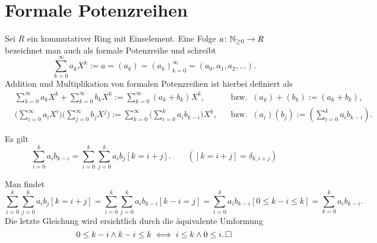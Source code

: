 \newpage
\section{Formale Potenzreihen}

\begin{Definition}\newlinefirst
Sei $R$ ein kommutativer Ring mit Einselement. Eine Folge
$a\colon\mathbb N_{\ge 0}\to R$ bezeichnet man auch als formale Potenzreihe
und schreibt
\[\sum_{k=0}^\infty a_k X^k := a = (a_k) = (a_k)_{k=0}^\infty
= (a_0,a_1,a_2,\ldots).\]
Addition und Multiplikation von formalen Potenzreihen ist hierbei
definiert als
\begin{align*}
& \sum_{k=0}^\infty a_k X^k + \sum_{k=0}^\infty b_k X^k
:= \sum_{k=0}^\infty (a_k + b_k)X^k, && \text{bzw.}\;\;(a_k) + (b_k) := (a_k + b_k),\\
& \bigg(\sum_{i=0}^\infty a_i X^i\bigg)\bigg(\sum_{j=0}^\infty b_j X^j\bigg)
:= \sum_{k=0}^\infty \bigg(\sum_{i=0}^k a_i b_{k-i}\bigg)X^k,
&& \text{bzw.}\;\;(a_i)(b_j) := ({\textstyle\sum_{i=0}^k a_i b_{k-i}}).
\end{align*}
\end{Definition}

\begin{Korollar} Es gilt
\[\sum_{i=0}^k a_i b_{k-i} = \sum_{i=0}^k\sum_{j=0}^k a_i b_j [k=i+j].\qquad ([k=i+j]=\delta_{k,i+j})\]
\end{Korollar}
\begin{Beweis} Man findet
\[\sum_{i=0}^k\sum_{j=0}^k a_i b_j [k{=}i{+}j]
= \sum_{i=0}^k\sum_{j=0}^k a_i b_{k-i} [k{-}i{=}j]
= \sum_{i=0}^k a_i b_{k-i} [0{\le}k{-}i{\le}k]
= \sum_{k=0}^k a_i b_{k-i}.\]
Die letzte Gleichung wird ersichtlich durch die äquivalente Umformung
\[0\le k-i\land k-i\le k\iff i\le k\land 0\le i.\,\square\]
\end{Beweis}

